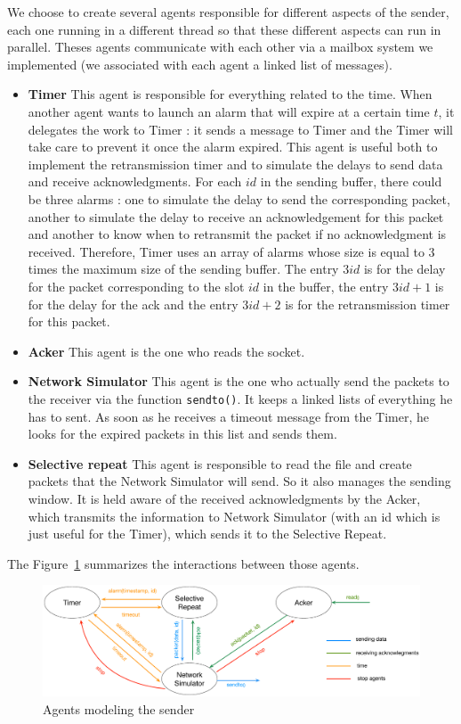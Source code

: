 \documentclass[11pt,a4paper]{article}
\begin{document}
We choose to create several agents responsible for different aspects of the sender, each one running in a different thread so that these different aspects can run in parallel. Theses agents communicate with each other via a mailbox system we implemented (we associated with each agent a linked list of messages).
\begin{itemize}
\item \textbf{Timer} This agent is responsible for everything related to the time. When another agent wants to launch an alarm that will expire at a certain time $t$, it delegates the work to Timer : it sends a message to Timer and the Timer will take care to prevent it once the alarm expired. This agent is useful both to implement the retransmission timer and to simulate the delays to send data and receive acknowledgments. For each $id$ in the sending buffer, there could be three alarms : one to simulate the delay to send the corresponding packet, another to simulate the delay to receive an acknowledgement for this packet and another to know when to retransmit the packet if no acknowledgment is received. Therefore, Timer uses an array of alarms whose size is equal to 3 times the maximum size of the sending buffer. The entry $3id$ is for the delay for the packet corresponding to the slot $id$ in the buffer, the entry $3id+1$ is for the delay for the ack and the entry $3id+2$ is for the retransmission timer for this packet.
\item \textbf{Acker} This agent is the one who reads the socket. 
\item \textbf{Network Simulator} This agent is the one who actually send the packets to the receiver via the function \texttt{sendto()}. It keeps a linked lists of everything he has to sent. As soon as he receives a timeout message from the Timer, he looks for the expired packets in this list and sends them.
\item \textbf{Selective repeat}  This agent is responsible to read the file and create packets that the Network Simulator will send. So it also manages the sending window. It is held aware of the received acknowledgments by the Acker, which transmits the information to Network Simulator (with an id which is just useful for the Timer), which sends it to the Selective Repeat.
\end{itemize}
The Figure~\ref{sender} summarizes the interactions between those agents. 

\begin{figure}[!h]
	\begin{center}
		\includegraphics[width=18cm]{images/sender.eps}
		\caption{Agents modeling the sender}
		\label{sender}
	\end{center}
\end{figure}
\end{document}
